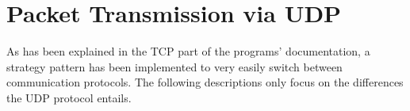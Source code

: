 \section{Packet Transmission via UDP}
As has been explained in the TCP part of the programs' documentation, a strategy pattern has been implemented to very easily switch between communication protocols. The following descriptions only focus on the differences the UDP protocol entails.


